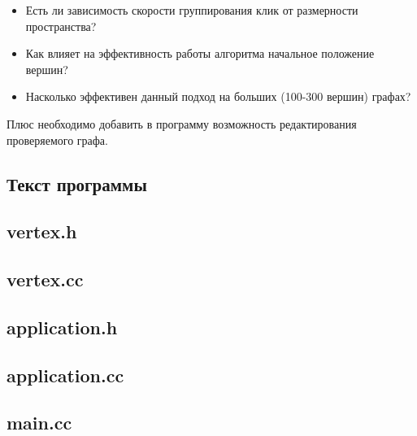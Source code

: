 \documentclass[12pt,a4paper,titlepage]{article}
\theoremstyle{definition}
\begin{document}
\begin{itemize}
  \item Есть ли зависимость скорости группирования клик от размерности
        пространства?
  \item Как влияет на эффективность работы алгоритма начальное положение вершин?
  \item Насколько эффективен данный подход на больших (100-300 вершин) графах?
\end{itemize}

Плюс необходимо добавить в программу возможность редактирования проверяемого
графа.
\clearpage
\begin{appendices}
\section{Текст программы}

\subsection{vertex.h}
  
\subsection{vertex.cc}
  
\subsection{application.h}
  
\subsection{application.cc}
  
\subsection{main.cc}
  
\end{appendices}
\end{document}
